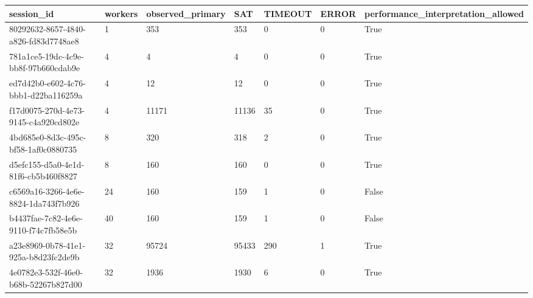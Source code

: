 \begin{tabular}{lllllll}
\hline
session\_id & workers & observed\_primary & SAT & TIMEOUT & ERROR & performance\_interpretation\_allowed \\
\hline
80292632-8657-4840-a826-fd83d7748ae8 & 1 & 353 & 353 & 0 & 0 & True \\
781a1ce5-19dc-4c9e-bb8f-97b660cdab9e & 4 & 4 & 4 & 0 & 0 & True \\
ed7d42b0-e602-4c76-bbb1-d22ba116259a & 4 & 12 & 12 & 0 & 0 & True \\
f17d0075-270d-4e73-9145-c4a920cd802e & 4 & 11171 & 11136 & 35 & 0 & True \\
4bd685e0-8d3c-495c-bf58-1af0c0880735 & 8 & 320 & 318 & 2 & 0 & True \\
d5efc155-d5a0-4e1d-81f6-cb5b460f8827 & 8 & 160 & 160 & 0 & 0 & True \\
c6569a16-3266-4e6e-8824-1da743f7b926 & 24 & 160 & 159 & 1 & 0 & False \\
b4437fae-7c82-4e6e-9110-f74c7fb58e5b & 40 & 160 & 159 & 1 & 0 & False \\
a23e8969-0b78-41e1-925a-b8d23fc2de9b & 32 & 95724 & 95433 & 290 & 1 & True \\
4e0782e3-532f-46e0-b68b-52267b827d00 & 32 & 1936 & 1930 & 6 & 0 & True \\
\hline
\end{tabular}
